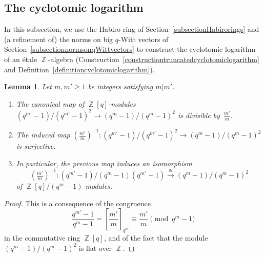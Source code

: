 \documentclass[10pt,twoside]{scrarticle}
\newtheorem{lemma}[theorem]{Lemma}
\theoremstyle{definition}
\DeclareMathOperator{\Z}{\mathbb{Z}}
\renewcommand{\ge}{\geqslant}
\numberwithin{equation}{theorem}
\begin{document}
\subsection{The cyclotomic logarithm}\label{subsectioncyclotomiclogarithm}

In this subsection, we use the Habiro ring of Section~\ref{subsectionHabirorings} and (a refinement of) the norms on big $q$-Witt vectors of Section~\ref{subsectionnormsonqWittvectors} to construct the cyclotomic logarithm of an étale $\Z$-algebra (Construction~\ref{constructiontruncatedcyclotomiclogarithm} and Definition~\ref{definitioncyclotomiclogarithm}).

\begin{lemma}\label{lemmadivisionbym/e}
    Let $m,m' \ge 1$ be integers satisfying $m|m'$.
    \begin{enumerate}
        \item\label{item:divisible-image} The canonical map of $\Z[q]$-modules $(q^{m'}-1)/(q^{m'}-1)^2 \rightarrow (q^m-1)/(q^m-1)^2$ is divisible by~$\frac{m'}{m}$.
        \item\label{item:divided-image} The induced map $(\frac{m'}{m})^{-1} : (q^{m'}-1)/(q^{m'}-1)^2 \rightarrow (q^m-1)/(q^m-1)^2$ is surjective.
        \item\label{item:isomorphism} In particular, the previous map induces an isomorphism  
        $$(\tfrac{m'}{m})^{-1} : (q^{m'}-1)/(q^m-1)(q^{m'}-1) \xrightarrow{\cong} (q^m-1)/(q^m-1)^2$$ of $\Z[q]/(q^m-1)$-modules.
    \end{enumerate}
\end{lemma}

\begin{proof}
    This is a consequence of the congruence
    $$\frac{q^{m'}-1}{q^m-1} =\left[\frac{m'}{m}\right]_{q^m}\equiv \frac{m'}{m} \pmod{q^m-1}$$
    in the commutative ring $\Z[q]$, and of the fact that the module $(q^m-1)/(q^m-1)^2$ is flat over $\Z$.
\end{proof}
\end{document}
